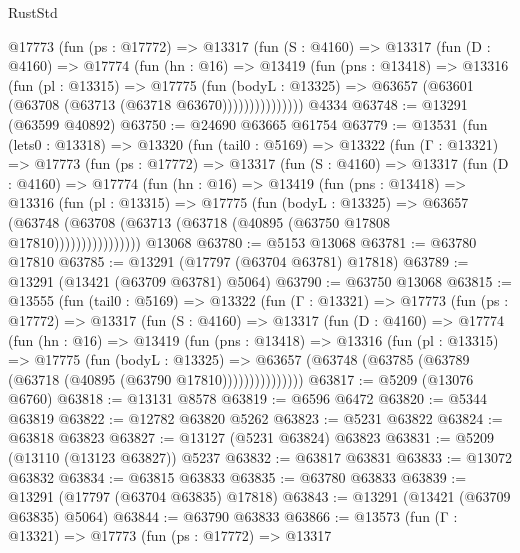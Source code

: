 \begin{lexlean}{RustStd}
\begin{coremodule}
          @17773
            (fun (ps : @17772) =>
            @13317
              (fun (S : @4160) =>
              @13317
                (fun (D : @4160) =>
                @17774
                  (fun (hn : @16) =>
                  @13419
                    (fun (pns : @13418) =>
                    @13316
                      (fun (pl : @13315) =>
                      @17775
                        (fun (bodyL : @13325) =>
                        @63657 (@63601 (@63708 (@63713 (@63718 @63670)))))))))))))))
    @4334
@63748 := @13291 (@63599 @40892)
@63750 := @24690 @63665 @61754
@63779 := @13531
    (fun (lets0 : @13318) =>
    @13320
      (fun (tail0 : @5169) =>
      @13322
        (fun (Γ : @13321) =>
        @17773
          (fun (ps : @17772) =>
          @13317
            (fun (S : @4160) =>
            @13317
              (fun (D : @4160) =>
              @17774
                (fun (hn : @16) =>
                @13419
                  (fun (pns : @13418) =>
                  @13316
                    (fun (pl : @13315) =>
                    @17775
                      (fun (bodyL : @13325) =>
                      @63657
                        (@63748
                          (@63708 (@63713 (@63718 (@40895 (@63750 @17808 @17810))))))))))))))))
    @13068
@63780 := @5153 @13068
@63781 := @63780 @17810
@63785 := @13291 (@17797 (@63704 @63781) @17818)
@63789 := @13291 (@13421 (@63709 @63781) @5064)
@63790 := @63750 @13068
@63815 := @13555
    (fun (tail0 : @5169) =>
    @13322
      (fun (Γ : @13321) =>
      @17773
        (fun (ps : @17772) =>
        @13317
          (fun (S : @4160) =>
          @13317
            (fun (D : @4160) =>
            @17774
              (fun (hn : @16) =>
              @13419
                (fun (pns : @13418) =>
                @13316
                  (fun (pl : @13315) =>
                  @17775
                    (fun (bodyL : @13325) =>
                    @63657 (@63748 (@63785 (@63789 (@63718 (@40895 (@63790 @17810)))))))))))))))
@63817 := @5209 (@13076 @6760)
@63818 := @13131 @8578
@63819 := @6596 @6472
@63820 := @5344 @63819
@63822 := @12782 @63820 @5262
@63823 := @5231 @63822
@63824 := @63818 @63823
@63827 := @13127 (@5231 @63824) @63823
@63831 := @5209 (@13110 (@13123 @63827)) @5237
@63832 := @63817 @63831
@63833 := @13072 @63832
@63834 := @63815 @63833
@63835 := @63780 @63833
@63839 := @13291 (@17797 (@63704 @63835) @17818)
@63843 := @13291 (@13421 (@63709 @63835) @5064)
@63844 := @63790 @63833
@63866 := @13573
    (fun (Γ : @13321) =>
    @17773
      (fun (ps : @17772) =>
      @13317

\end{coremodule}
\end{lexlean}
